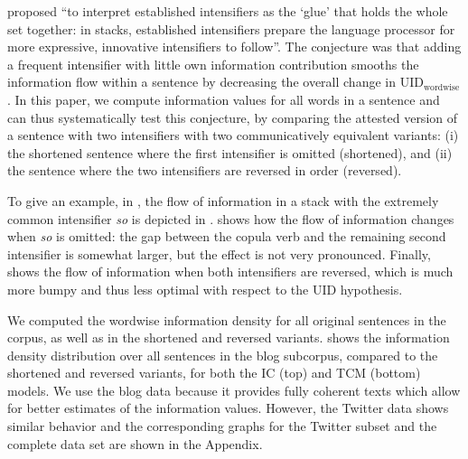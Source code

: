 \documentclass[output=paper,colorlinks,citecolor=brown]{langscibook}
\begin{document}
\citet[14]{scherihou2022} proposed ``to interpret established intensifiers as the `glue' that holds the whole set together: in stacks, established intensifiers prepare the language processor for more expressive, innovative intensifiers to follow''. The conjecture was that adding a frequent intensifier with little own information contribution smooths the information flow within a sentence by decreasing the overall change in $\mathrm{UID_{wordwise}}$. In this paper, we compute information values for all words in a sentence and can thus systematically test this conjecture, by comparing the attested version of a sentence with two intensifiers with two communicatively equivalent variants:
\largerpage
(i) the shortened sentence where the first intensifier is omitted (shortened), and (ii) the sentence where the two intensifiers are reversed in order (reversed).

To give an example, in , the flow of information in a stack with the extremely common intensifier \textit{so} is depicted in .  shows how the flow of information changes when \textit{so} is omitted: the gap between the copula verb and the remaining second intensifier is somewhat larger, but the effect is not very pronounced. Finally,  shows the flow of information when both intensifiers are reversed, which is much more bumpy and thus less optimal with respect to the UID hypothesis.



We computed the wordwise information density for all original sentences in the corpus, as well as in the shortened and reversed variants.  shows the information density distribution over all sentences in the blog subcorpus, compared to the shortened and reversed variants, for both the IC (top) and TCM (bottom) models. We use the blog data because it provides fully coherent texts which allow for better estimates of the information values. However, the Twitter data shows similar behavior and the corresponding graphs for the Twitter subset and the complete data set are shown in the Appendix. 
\end{document}
